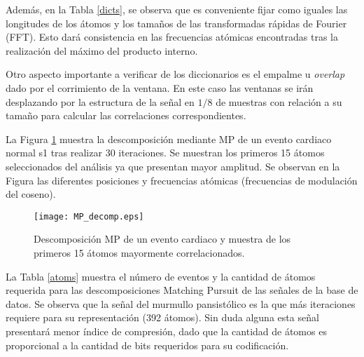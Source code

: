 Además, en la Tabla \ref{dicts}, se observa que es conveniente fijar como iguales las longitudes de los átomos y los tamaños de las transformadas rápidas de Fourier (FFT). Esto dará consistencia en las frecuencias atómicas encontradas tras la realización del máximo del producto interno. 

Otro aspecto importante a verificar de los diccionarios es el empalme u \emph{overlap} dado por el corrimiento de la ventana. En este caso las ventanas se irán desplazando por la estructura de la señal en $1/8$ de muestras con relación a su tamaño para calcular las correlaciones correspondientes.

La Figura \ref{MPDecomp} muestra la descomposición mediante MP de un evento cardiaco normal s1 tras realizar 30 iteraciones. Se muestran los primeros 15 átomos seleccionados del análisis ya que presentan mayor amplitud. Se observan en la Figura las diferentes posiciones y frecuencias atómicas (frecuencias de modulación del coseno).
\begin{figure}[ht]
  \centering
  \texttt{[image: MP\_decomp.eps]}
  \caption{Descomposición MP de un evento cardiaco y muestra de los primeros 15 átomos mayormente correlacionados.}
  \label{MPDecomp}
\end{figure}

La Tabla \ref{atoms} muestra el número de eventos y la cantidad de átomos requerida para las descomposiciones Matching Pursuit de las señales de la base de datos. Se observa que la señal del murmullo pansistólico es la que más iteraciones requiere para su representación (392 átomos). Sin duda alguna esta señal presentará menor índice de compresión, dado que la cantidad de átomos es proporcional a la cantidad de bits requeridos para su codificación.

